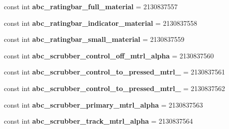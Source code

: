 \begin{DoxyCompactItemize}
const int {\bfseries abc\+\_\+ratingbar\+\_\+full\+\_\+material} = 2130837557
\item 
\mbox{\label{class_sample_app_1_1_droid_1_1_resource_1_1_drawable_ae9f29a487945c4204e6fdc2787291a4e}} 
const int {\bfseries abc\+\_\+ratingbar\+\_\+indicator\+\_\+material} = 2130837558
\item 
\mbox{\label{class_sample_app_1_1_droid_1_1_resource_1_1_drawable_a794f787a2f74dba4e66a8f76e45410b3}} 
const int {\bfseries abc\+\_\+ratingbar\+\_\+small\+\_\+material} = 2130837559
\item 
\mbox{\label{class_sample_app_1_1_droid_1_1_resource_1_1_drawable_a4e4468498c1a82867c982e51c505d527}} 
const int {\bfseries abc\+\_\+scrubber\+\_\+control\+\_\+off\+\_\+mtrl\+\_\+alpha} = 2130837560
\item 
\mbox{\label{class_sample_app_1_1_droid_1_1_resource_1_1_drawable_a67939ab4690c3cda46de94fdc40bac68}} 
const int {\bfseries abc\+\_\+scrubber\+\_\+control\+\_\+to\+\_\+pressed\+\_\+mtrl\+\_} = 2130837561
\item 
\mbox{\label{class_sample_app_1_1_droid_1_1_resource_1_1_drawable_a673e921afedf7e489930b2dadd5b4bf3}} 
const int {\bfseries abc\+\_\+scrubber\+\_\+control\+\_\+to\+\_\+pressed\+\_\+mtrl\+\_} = 2130837562
\item 
\mbox{\label{class_sample_app_1_1_droid_1_1_resource_1_1_drawable_a7d45fdc023455608679ac8d88eed8f92}} 
const int {\bfseries abc\+\_\+scrubber\+\_\+primary\+\_\+mtrl\+\_\+alpha} = 2130837563
\item 
\mbox{\label{class_sample_app_1_1_droid_1_1_resource_1_1_drawable_a525e7bd236c62acc4aa574125e0a66ee}} 
const int {\bfseries abc\+\_\+scrubber\+\_\+track\+\_\+mtrl\+\_\+alpha} = 2130837564
\item 
\mbox{\label{class_sample_app_1_1_droid_1_1_resource_1_1_drawable_a1337c71a7f24d2453fef1abbb7ff1a9e}} 

\end{DoxyCompactItemize}
